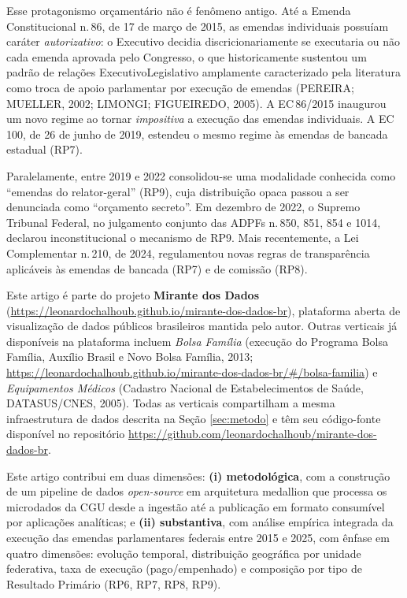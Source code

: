 \documentclass[12pt,a4paper,oneside]{article}
\begin{document}
Esse protagonismo orçamentário não é fenômeno antigo. Até a Emenda
Constitucional n.\,86, de 17 de março de 2015, as emendas individuais
possuíam caráter \textit{autorizativo}: o Executivo decidia
discricionariamente se executaria ou não cada emenda aprovada pelo
Congresso, o que historicamente sustentou um padrão de relações
Executivo\textendash Legislativo amplamente caracterizado pela
literatura como troca de apoio parlamentar por execução de emendas
(PEREIRA; MUELLER, 2002; LIMONGI; FIGUEIREDO, 2005). A EC\,86/2015
inaugurou um novo regime ao tornar \textit{impositiva} a execução
das emendas individuais. A EC\,100, de 26 de junho de 2019, estendeu
o mesmo regime às emendas de bancada estadual (RP7).

Paralelamente, entre 2019 e 2022 consolidou-se uma modalidade
conhecida como ``emendas do relator-geral'' (RP9), cuja distribuição
opaca passou a ser denunciada como ``orçamento secreto''. Em dezembro
de 2022, o Supremo Tribunal Federal, no julgamento conjunto das
ADPFs n.\,850, 851, 854 e 1014, declarou inconstitucional o mecanismo
de RP9. Mais recentemente, a Lei Complementar n.\,210, de 2024,
regulamentou novas regras de transparência aplicáveis às emendas de
bancada (RP7) e de comissão (RP8).

Este artigo é parte do projeto \textbf{Mirante dos Dados}
(\url{https://leonardochalhoub.github.io/mirante-dos-dados-br}),
plataforma aberta de visualização de dados públicos brasileiros
mantida pelo autor. Outras verticais já disponíveis na plataforma
incluem \textit{Bolsa Família} (execução do Programa Bolsa Família,
Auxílio Brasil e Novo Bolsa Família, 2013;
\url{https://leonardochalhoub.github.io/mirante-dos-dados-br/\#/bolsa-familia})
e \textit{Equipamentos Médicos} (Cadastro Nacional de
Estabelecimentos de Saúde, DATASUS/CNES, 2005).
Todas as verticais compartilham a mesma infraestrutura de dados
descrita na Seção \ref{sec:metodo} e têm seu código-fonte disponível
no repositório
\url{https://github.com/leonardochalhoub/mirante-dos-dados-br}.

Este artigo contribui em duas dimensões: \textbf{(i) metodológica},
com a construção de um pipeline de dados \textit{open-source} em
arquitetura medallion que processa os microdados da CGU desde a
ingestão até a publicação em formato consumível por aplicações
analíticas; e \textbf{(ii) substantiva}, com análise empírica
integrada da execução das emendas parlamentares federais entre 2015
e 2025, com ênfase em quatro dimensões: evolução temporal,
distribuição geográfica por unidade federativa, taxa de execução
(pago/empenhado) e composição por tipo de Resultado Primário (RP6,
RP7, RP8, RP9).
\end{document}
